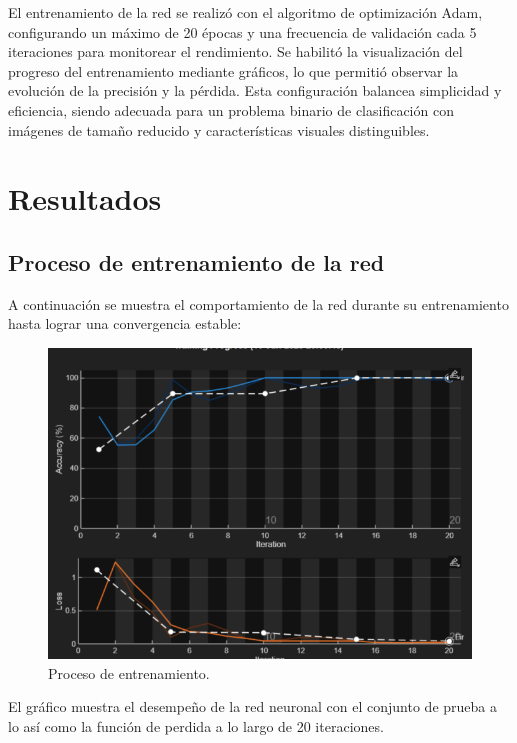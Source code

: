 \documentclass[11pt, letterpaper]{article}
\begin{document}
  El entrenamiento de la red se realizó con el algoritmo de optimización Adam, configurando un máximo de 20 épocas y una frecuencia de validación cada 5 iteraciones para monitorear el rendimiento. Se habilitó la visualización del progreso del entrenamiento mediante gráficos, lo que permitió observar la evolución de la precisión y la pérdida. Esta configuración balancea simplicidad y eficiencia, siendo adecuada para un problema binario de clasificación con imágenes de tamaño reducido y características visuales distinguibles.


\newpage
	
\section{Resultados}

\subsection{Proceso de entrenamiento de la red}

A continuación se muestra el comportamiento de la red durante su entrenamiento hasta lograr una convergencia estable:


\begin{figure}[h!]
	\centering
	\begin{minipage}{1\textwidth}
		\centering
		\includegraphics[width=1\textwidth]{IMG/G1.png}
	\end{minipage}
	\caption{Proceso de entrenamiento.}
	\label{fig:f2}
\end{figure}

El gráfico muestra el desempeño de la red neuronal con el conjunto de prueba a lo así como la función de perdida a lo largo de 20 iteraciones.
\end{document}
